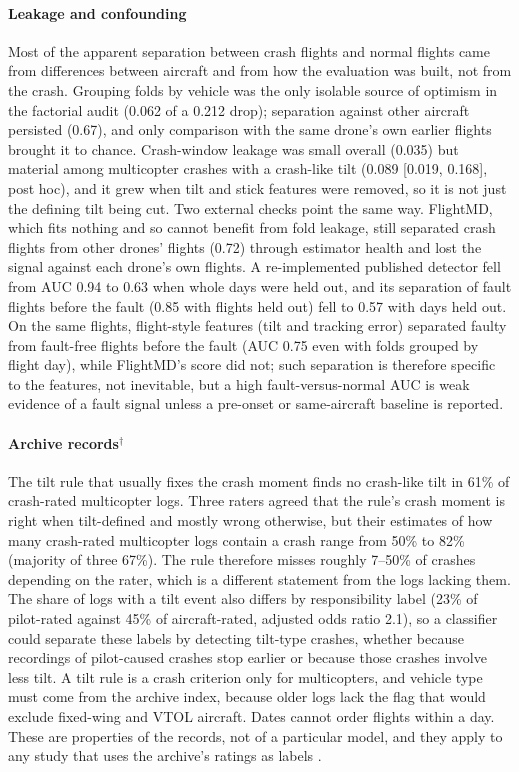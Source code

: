\documentclass[preprint,12pt]{elsarticle}
\begin{document}
\paragraph{Leakage and confounding} Most of the apparent separation between crash flights and normal flights came from differences between aircraft and from how the evaluation was built, not from the crash. Grouping folds by vehicle was the only isolable source of optimism in the factorial audit (0.062 of a 0.212 drop); separation against other aircraft persisted (0.67), and only comparison with the same drone's own earlier flights brought it to chance. Crash-window leakage was small overall (0.035) but material among multicopter crashes with a crash-like tilt (0.089 [0.019, 0.168], post hoc), and it grew when tilt and stick features were removed, so it is not just the defining tilt being cut. Two external checks point the same way. FlightMD, which fits nothing and so cannot benefit from fold leakage, still separated crash flights from other drones' flights (0.72) through estimator health and lost the signal against each drone's own flights. A re-implemented published detector fell from AUC 0.94 to 0.63 when whole days were held out, and its separation of fault flights before the fault (0.85 with flights held out) fell to 0.57 with days held out. On the same flights, flight-style features (tilt and tracking error) separated faulty from fault-free flights before the fault (AUC 0.75 even with folds grouped by flight day), while FlightMD's score did not; such separation is therefore specific to the features, not inevitable, but a high fault-versus-normal AUC is weak evidence of a fault signal unless a pre-onset or same-aircraft baseline is reported.

\paragraph{Archive records$^\dagger$} The tilt rule that usually fixes the crash moment finds no crash-like tilt in 61\% of crash-rated multicopter logs. Three raters agreed that the rule's crash moment is right when tilt-defined and mostly wrong otherwise, but their estimates of how many crash-rated multicopter logs contain a crash range from 50\% to 82\% (majority of three 67\%). The rule therefore misses roughly 7--50\% of crashes depending on the rater, which is a different statement from the logs lacking them. The share of logs with a tilt event also differs by responsibility label (23\% of pilot-rated against 45\% of aircraft-rated, adjusted odds ratio 2.1), so a classifier could separate these labels by detecting tilt-type crashes, whether because recordings of pilot-caused crashes stop earlier or because those crashes involve less tilt. A tilt rule is a crash criterion only for multicopters, and vehicle type must come from the archive index, because older logs lack the flag that would exclude fixed-wing and VTOL aircraft. Dates cannot order flights within a day. These are properties of the records, not of a particular model, and they apply to any study that uses the archive's ratings as labels \cite{kabaoglu2026uavsead}.
\end{document}
